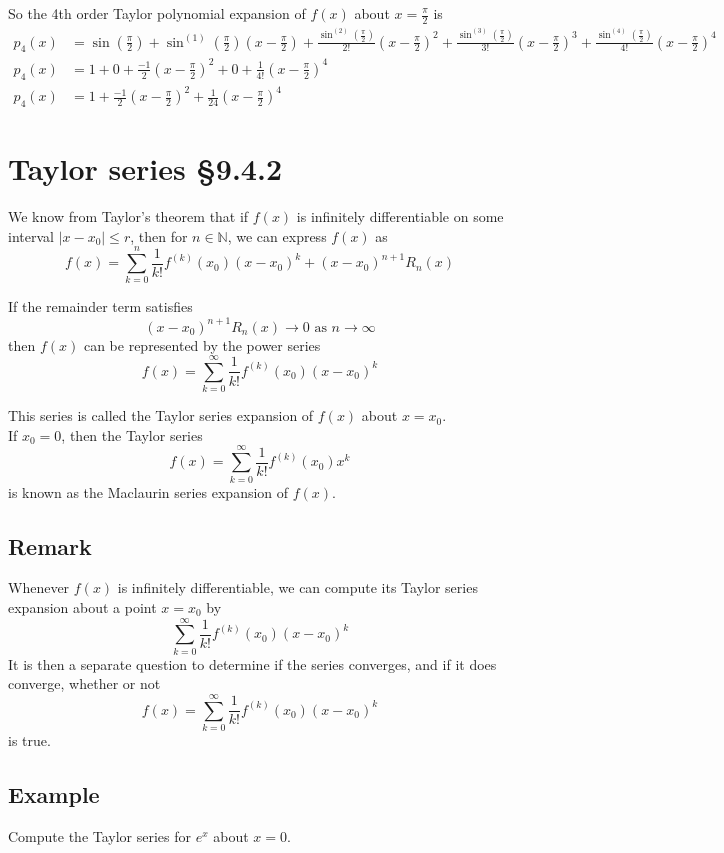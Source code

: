 \documentclass[11pt]{article}
\newcommand{\naturals}{\mathbb{N}}
\begin{document}
So the 4th order Taylor polynomial expansion of $f(x)$ about $x=\frac{\pi}{2}$ is
\begin{align*}
p_4(x) &= \sin(\frac{\pi}{2}) + \sin^{(1)}(\frac{\pi}{2}) (x-\frac{\pi}{2}) +  \frac{\sin^{(2)}(\frac{\pi}{2})}{2!} (x-\frac{\pi}{2})^2 +  \frac{\sin^{(3)}(\frac{\pi}{2})}{3!} (x-\frac{\pi}{2})^3 +  \frac{\sin^{(4)}(\frac{\pi}{2})}{4!} (x-\frac{\pi}{2})^4 \\
p_4(x) &= 1 + 0 + \frac{-1}{2} (x-\frac{\pi}{2})^2 + 0 + \frac{1}{4!} (x-\frac{\pi}{2})^4 \\
p_4(x) &= 1 + \frac{-1}{2} (x-\frac{\pi}{2})^2 + \frac{1}{24} (x-\frac{\pi}{2})^4
\end{align*}

\section{Taylor series §9.4.2}
We know from Taylor's theorem that if $f(x)$ is infinitely differentiable on some interval $|x - x_0| \leq r$, then for $n \in \naturals$, we can express $f(x)$ as
\[ f(x) = \sum_{k=0}^n \frac{1}{k!} f^{(k)}(x_0)(x-x_0)^k + (x-x_0)^{n+1} R_n(x) \]

If the remainder term satisfies
\[ (x-x_0)^{n+1} R_n(x) \rightarrow 0 \text{ as } n \rightarrow \infty \]
then $f(x)$ can be represented by the power series 
\[ f(x) = \sum_{k=0}^\infty \frac{1}{k!} f^{(k)}(x_0)(x-x_0)^k \]

This series is called the Taylor series expansion of $f(x)$ about $x=x_0$.\\
If $x_0=0$, then the Taylor series
\[ f(x) = \sum_{k=0}^\infty \frac{1}{k!} f^{(k)} (x_0) x^k \]
is known as the Maclaurin series expansion of $f(x)$.

\subsection{Remark}
Whenever $f(x)$ is infinitely differentiable, we can compute its Taylor series expansion about a point $x=x_0$ by 
\[ \sum_{k=0}^\infty \frac{1}{k!} f^{(k)} (x_0)(x-x_0)^k \]
It is then a separate question to determine if the series converges, and if it does converge, whether or not
\[ f(x) = \sum_{k=0}^\infty \frac{1}{k!} f^{(k)} (x_0)(x-x_0)^k \] 
is true.

\subsection{Example}
Compute the Taylor series for $e^x$ about $x=0$.
\end{document}
